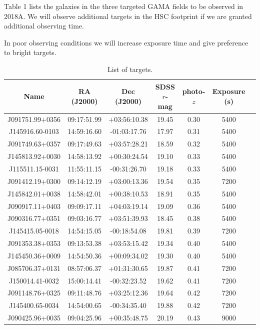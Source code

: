 \documentclass[letterpaper,12pt]{article}
\begin{document}
Table 1 lists the galaxies in the three targeted GAMA fields to be observed in 2018A. We will observe additional
targets in the HSC footprint if we are granted additional observing time.

In poor observing conditions we will increase exposure time and give preference to bright targets. 

\begin{table}
\caption{List of targets.}
\begin{tabular}{ccccccc}
\hline

Name & RA (J2000) & Dec (J2000) & SDSS $r$-mag & photo-$z$ & Exposure (s) \\
\hline
J091751.99+0356 & 09:17:51.99 & +03:56:10.38 & 19.45 & 0.30 & 5400 \\
J145916.60-0103 & 14:59:16.60 & -01:03:17.76 & 17.97 & 0.31 & 5400 \\
J091749.63+0357 & 09:17:49.63 & +03:57:28.21 & 18.59 & 0.32 & 5400 \\
J145813.92+0030 & 14:58:13.92 & +00:30:24.54 & 19.10 & 0.33 & 5400 \\
J115511.15-0031 & 11:55:11.15 & -00:31:26.70 & 19.18 & 0.33 & 5400 \\
J091412.19+0300 & 09:14:12.19 & +03:00:13.36 & 19.54 & 0.35 & 7200 \\
J145842.01+0038 & 14:58:42.01 & +00:38:10.53 & 18.91 & 0.35 & 5400 \\
J090917.11+0403 & 09:09:17.11 & +04:03:19.14 & 19.09 & 0.36 & 5400 \\
J090316.77+0351 & 09:03:16.77 & +03:51:39.93 & 18.45 & 0.38 & 5400 \\
J145415.05-0018 & 14:54:15.05 & -00:18:54.08 & 19.81 & 0.39 & 7200 \\
J091353.38+0353 & 09:13:53.38 & +03:53:15.42 & 19.34 & 0.40 & 5400 \\
J145450.36+0009 & 14:54:50.36 & +00:09:34.02 & 19.30 & 0.40 & 5400 \\
J085706.37+0131 & 08:57:06.37 & +01:31:30.65 & 19.87 & 0.41 & 7200 \\
J150014.41-0032 & 15:00:14.41 & -00:32:23.52 & 19.62 & 0.41 & 7200 \\
J091148.76+0325 & 09:11:48.76 & +03:25:12.36 & 19.64 & 0.42 & 7200 \\
J145400.65-0034 & 14:54:00.65 & -00:34:35.40 & 19.88 & 0.42 & 7200 \\
J090425.96+0035 & 09:04:25.96 & +00:35:48.75 & 20.19 & 0.43 & 9000 \\

\end{tabular}
\end{table}
\end{document}
